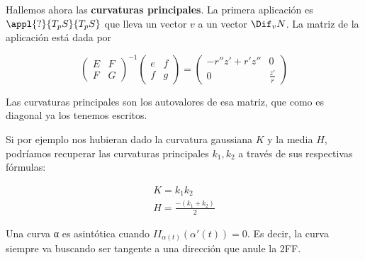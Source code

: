 \begin{problem}[3]
Hallemos ahora las \textbf{curvaturas principales}. La primera aplicación es $\appl{?}{T_pS}{T_pS}$ que lleva un vector $v$ a un vector $\Dif_vN$. La matriz de la aplicación está dada por 

\[ \begin{pmatrix}
E & F \\ F & G
\end{pmatrix}^{-1}
\begin{pmatrix}
e & f \\ f & g
\end{pmatrix} = \begin{pmatrix}
-r''z' + r'z'' & 0 \\ 0 & \frac{z'}{r}
\end{pmatrix}\]

Las curvaturas principales son los autovalores de esa matriz, que como es diagonal ya los tenemos escritos.

Si por ejemplo nos hubieran dado la curvatura gaussiana $K$ y la media $H$, podríamos recuperar las curvaturas principales $k_1,k_2$ a través de sus respectivas fórmulas:

\begin{gather*}
 K = k_1k_2 \\
 H = \frac{-(k_1 + k_2)}{2}
\end{gather*}

\end{problem}

Una curva α es asintótica cuando $II_{α(t)}(α'(t)) = 0$. Es decir, la curva siempre va buscando ser tangente a una dirección que anule la 2FF.

